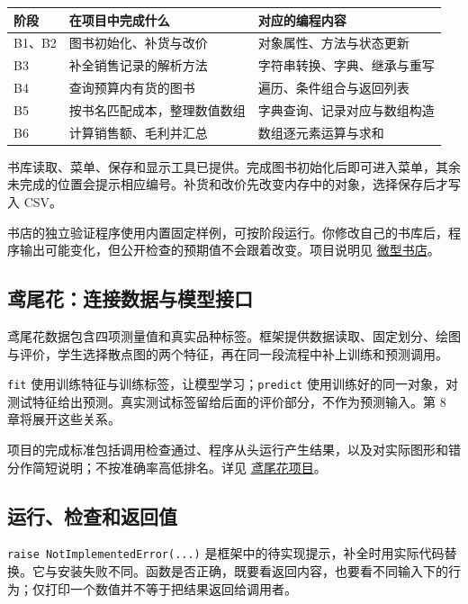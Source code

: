\documentclass[UTF8,a4paper,11pt,fontset=fandol]{ctexart}
\providecommand{\passthrough}[1]{#1}
\begin{document}
\begin{longtable}[]{@{}lll@{}}
\toprule\noalign{}
阶段 & 在项目中完成什么 & 对应的编程内容 \\
\midrule\noalign{}
\endhead
\bottomrule\noalign{}
\endlastfoot
B1、B2 & 图书初始化、补货与改价 & 对象属性、方法与状态更新 \\
B3 & 补全销售记录的解析方法 & 字符串转换、字典、继承与重写 \\
B4 & 查询预算内有货的图书 & 遍历、条件组合与返回列表 \\
B5 & 按书名匹配成本，整理数值数组 & 字典查询、记录对应与数组构造 \\
B6 & 计算销售额、毛利并汇总 & 数组逐元素运算与求和 \\
\end{longtable}

书库读取、菜单、保存和显示工具已提供。完成图书初始化后即可进入菜单，其余未完成的位置会提示相应编号。补货和改价先改变内存中的对象，选择保存后才写入 CSV。

书店的独立验证程序使用内置固定样例，可按阶段运行。你修改自己的书库后，程序输出可能变化，但公开检查的预期值不会跟着改变。项目说明见 \href{code/bookstore/README.md}{微型书店}。

\subsection{鸢尾花：连接数据与模型接口}\label{ux9e22ux5c3eux82b1ux8fdeux63a5ux6570ux636eux4e0eux6a21ux578bux63a5ux53e3}

鸢尾花数据包含四项测量值和真实品种标签。框架提供数据读取、固定划分、绘图与评价，学生选择散点图的两个特征，再在同一段流程中补上训练和预测调用。

\passthrough{\lstinline!fit!} 使用训练特征与训练标签，让模型学习；\passthrough{\lstinline!predict!} 使用训练好的同一对象，对测试特征给出预测。真实测试标签留给后面的评价部分，不作为预测输入。第 8 章将展开这些关系。

项目的完成标准包括调用检查通过、程序从头运行产生结果，以及对实际图形和错分作简短说明；不按准确率高低排名。详见 \href{code/iris/README.md}{鸢尾花项目}。

\subsection{运行、检查和返回值}\label{ux8fd0ux884cux68c0ux67e5ux548cux8fd4ux56deux503c}

\passthrough{\lstinline!raise NotImplementedError(...)!} 是框架中的待实现提示，补全时用实际代码替换。它与安装失败不同。函数是否正确，既要看返回内容，也要看不同输入下的行为；仅打印一个数值并不等于把结果返回给调用者。
\end{document}
